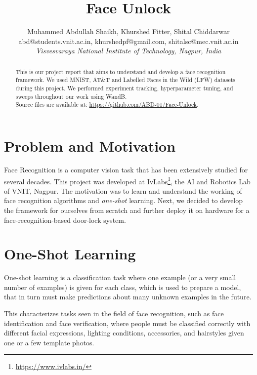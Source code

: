 \documentclass[aps,prb,twocolumn,superscriptaddress,floatfix,longbibliography, nofootinbib]{revtex4-2}
\newcounter{para}
\newcommand{\mytitle}{\Huge Face Unlock}
\begin{document}
\title{\mytitle}

\author{
Muhammed Abdullah Shaikh, Khurshed Fitter, Shital Chiddarwar\\
abd@students.vnit.ac.in, khurshedpf@gmail.com, shitalsc@mec.vnit.ac.in\\
\textit{Visvesvaraya National Institute of Technology, Nagpur, India}
}


\begin{abstract}
This is our project report that aims to understand and develop a face recognition framework. We used MNIST, AT\&T and Labelled Faces in the Wild (LFW) datasets during this project. We performed experiment tracking, hyperparameter tuning, and sweeps throughout our work using WandB.\\ Source files are available at: \url{https://github.com/ABD-01/Face-Unlock}.
\end{abstract}

\maketitle
\section{\label{sec:Start}Problem and Motivation}

Face Recognition is a computer vision task that has been extensively studied for several decades. This project was developed at IvLabs\footnote{\url{https://www.ivlabs.in/}}, the AI and Robotics Lab of VNIT, Nagpur. The motivation was to learn and understand the working of face recognition algorithms and \textit{one-shot} learning. Next, we decided to develop the framework for ourselves from scratch and further deploy it on hardware for a face-recognition-based door-lock system.

\section{\label{sec:oneshot}One-Shot Learning}
One-shot learning is a classification task where one example (or a very small number of examples) is given for each class, which is used to prepare a model, that in turn must make predictions about many unknown examples in the future.

This characterizes tasks seen in the field of face recognition, such as face identification and face verification, where people must be classified correctly with different facial expressions, lighting conditions, accessories, and hairstyles given one or a few template photos.
\end{document}
